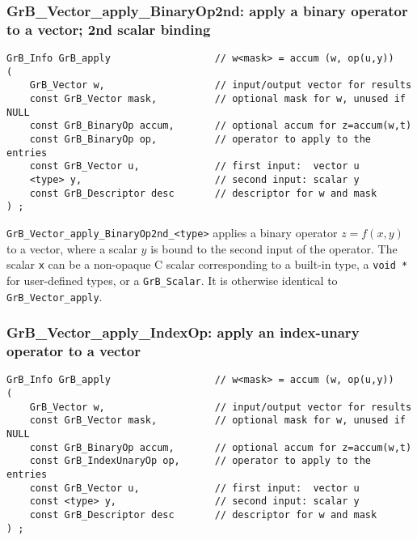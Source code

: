 \documentclass[12pt]{article}
\begin{document}
{%
\subsubsection{{\sf GrB\_Vector\_apply\_BinaryOp2nd:} apply a binary operator to a vector; 2nd scalar binding}
\label{vector_apply2nd}

\begin{mdframed}[userdefinedwidth=6in]
{\footnotesize
\begin{verbatim}
GrB_Info GrB_apply                  // w<mask> = accum (w, op(u,y))
(
    GrB_Vector w,                   // input/output vector for results
    const GrB_Vector mask,          // optional mask for w, unused if NULL
    const GrB_BinaryOp accum,       // optional accum for z=accum(w,t)
    const GrB_BinaryOp op,          // operator to apply to the entries
    const GrB_Vector u,             // first input:  vector u
    <type> y,                       // second input: scalar y
    const GrB_Descriptor desc       // descriptor for w and mask
) ;
\end{verbatim} } \end{mdframed}

\verb'GrB_Vector_apply_BinaryOp2nd_<type>'  applies a binary operator
$z=f(x,y)$ to a vector, where a scalar $y$ is bound to the second input of the
operator.
The scalar \verb'x' can be a non-opaque C scalar corresponding to a built-in
type, a \verb'void *' for user-defined types, or a \verb'GrB_Scalar'.
It is otherwise identical to \verb'GrB_Vector_apply'.

\newpage
\subsubsection{{\sf GrB\_Vector\_apply\_IndexOp:} apply an index-unary operator to a vector}
\label{vector_apply_idxunop}

\begin{mdframed}[userdefinedwidth=6in]
{\footnotesize
\begin{verbatim}
GrB_Info GrB_apply                  // w<mask> = accum (w, op(u,y))
(
    GrB_Vector w,                   // input/output vector for results
    const GrB_Vector mask,          // optional mask for w, unused if NULL
    const GrB_BinaryOp accum,       // optional accum for z=accum(w,t)
    const GrB_IndexUnaryOp op,      // operator to apply to the entries
    const GrB_Vector u,             // first input:  vector u
    const <type> y,                 // second input: scalar y
    const GrB_Descriptor desc       // descriptor for w and mask
) ;
\end{verbatim} } \end{mdframed}

}
\end{document}
